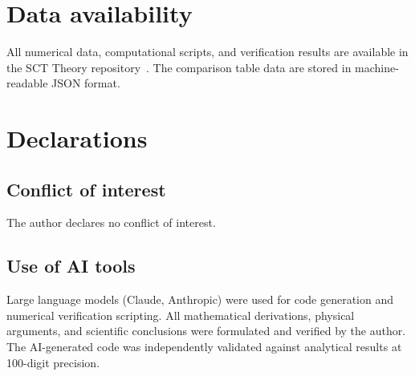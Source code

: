 \documentclass[12pt,a4paper]{article}
\theoremstyle{plain}
\theoremstyle{definition}
\theoremstyle{remark}
\begin{document}
\section*{Data availability}

All numerical data, computational scripts, and verification
results are available in the SCT Theory
repository~\cite{Alfyorov:2026repo}.  The comparison table
data are stored in machine-readable JSON format.

\section*{Declarations}

\subsection*{Conflict of interest}
The author declares no conflict of interest.

\subsection*{Use of AI tools}
Large language models (Claude, Anthropic) were used for code generation
and numerical verification scripting. All mathematical derivations,
physical arguments, and scientific conclusions were formulated and
verified by the author. The AI-generated code was independently
validated against analytical results at 100-digit precision.



\end{document}
